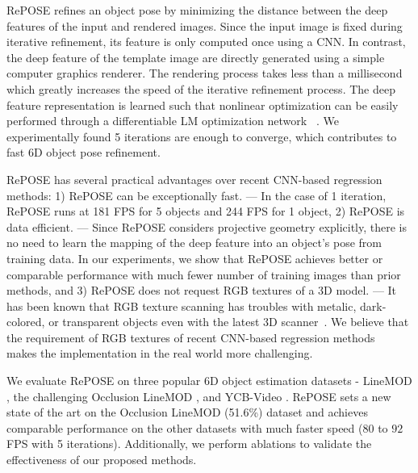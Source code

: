 \documentclass[10pt,twocolumn,letterpaper]{article}
\begin{document}
RePOSE refines an object pose by minimizing the distance between the deep features of the input and rendered images. Since the input image is fixed during iterative refinement, its feature is only computed once using a CNN. In contrast, the deep feature of the template image are directly generated using a simple computer graphics renderer. The rendering process takes less than a millisecond which greatly increases the speed of the iterative refinement process. The deep feature representation is learned such that nonlinear optimization can be easily performed through a differentiable LM optimization network ~\cite{10.1007/BFb0067700}. We experimentally found 5 iterations are enough to converge, which contributes to fast 6D object pose refinement.

RePOSE has several practical advantages over recent CNN-based regression methods: 1) RePOSE can be exceptionally fast. --- In the case of 1 iteration, RePOSE runs at 181 FPS for 5 objects and 244 FPS for 1 object, 2) RePOSE is data efficient. --- Since RePOSE considers projective geometry explicitly, there is no need to learn the mapping of the deep feature into an object’s pose from training data. In our experiments, we show that RePOSE achieves better or comparable performance with much fewer number of training images than prior methods, and 3) RePOSE does not request RGB textures of a 3D model. --- It has been known that RGB texture scanning has troubles with metalic, dark-colored, or transparent objects even with the latest 3D scanner~\cite{EinScanPro}. We believe that the requirement of RGB textures of recent CNN-based regression methods~\cite{li2018deepim,labbe2020} makes the implementation in the real world more challenging.

We evaluate RePOSE on three popular 6D object estimation datasets - LineMOD \cite{linemod}, the challenging Occlusion LineMOD \cite{10.1007/978-3-319-10605-2_35}, and YCB-Video \cite{xiang2018posecnn}. RePOSE sets a new state of the art on the Occlusion LineMOD (51.6\%) \cite{10.1007/978-3-319-10605-2_35} dataset and achieves comparable performance on the other datasets with much faster speed ($80$ to $92$ FPS with 5 iterations). Additionally, we perform ablations to validate the effectiveness of our proposed methods.
\end{document}
